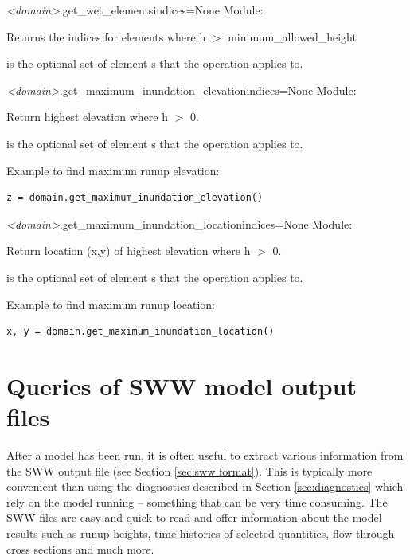 \documentclass{manual}
\begin{document}
\begin{methoddesc}{\emph{<domain>}.get_wet_elements}{indices=None}
Module: 

Returns the indices for elements where h $>$ minimum_allowed_height

 is the optional set of element s that
the operation applies to.
\end{methoddesc}

\begin{methoddesc}{\emph{<domain>}.get_maximum_inundation_elevation}{indices=None}
Module: 

Return highest elevation where h $>$ 0.

 is the optional set of element s that
the operation applies to.

Example to find maximum runup elevation:
\begin{verbatim}
z = domain.get_maximum_inundation_elevation()
\end{verbatim}
\end{methoddesc}

\begin{methoddesc}{\emph{<domain>}.get_maximum_inundation_location}{indices=None}
Module: 

Return location (x,y) of highest elevation where h $>$ 0.

 is the optional set of element s that
the operation applies to.

Example to find maximum runup location:
\begin{verbatim}
x, y = domain.get_maximum_inundation_location()
\end{verbatim}
\end{methoddesc}


\section{Queries of SWW model output files}
After a model has been run, it is often useful to extract various information from the SWW
output file (see Section \ref{sec:sww format}). This is typically more convenient than using the
diagnostics described in Section \ref{sec:diagnostics} which rely on the model running -- something
that can be very time consuming. The SWW files are easy and quick to read and offer information
about the model results such as runup heights, time histories of selected quantities,
flow through cross sections and much more.
\end{document}
